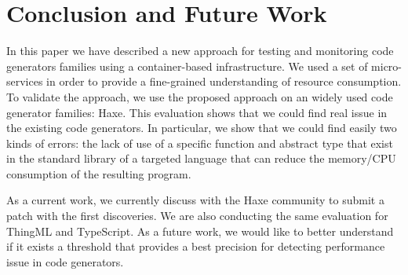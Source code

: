 \section{Conclusion and Future Work}

In this paper we have described a new approach for testing and monitoring code generators families using a container-based infrastructure. 
We used a set of micro-services in order to provide a fine-grained understanding of resource consumption. 
To validate the approach, we use the proposed approach on an widely used code generator families: Haxe. This evaluation shows that we could find real issue in the existing code generators. In particular, we show that we could find easily two kinds of errors: the lack of use of a specific function and abstract type that exist in the standard library of a targeted language  that can reduce the memory/CPU consumption of the resulting program.

As a current work, we currently discuss with the Haxe community to submit a patch with the first discoveries. We are also conducting the same evaluation for ThingML and TypeScript. As a future work, we would like to better understand if it exists a threshold that provides a best precision for detecting performance issue in code generators. 



